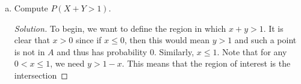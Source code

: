 \documentclass[12pt]{article}
\newenvironment{solution}
{\renewcommand\qedsymbol{$\blacksquare$}\begin{proof}[Solution]}
{\end{proof}}
\begin{document}
\begin{enumerate}
\begin{enumerate}[(a)]
\begin{solution}
                        the non-negative property of a jointly continuous pdf.
                        Next, 
                        we need a value $C>0$ such that 
                        \begin{equation*}
                            \int_{-\infty}^{\infty}\int_{-\infty}^{\infty}f_{X,
                            Y}(x, y)dxdy=1. 
                        \end{equation*}
                        Since we are integrating over the upper half of the
                        unit disk, we will convert to polar coordinates by
                        letting $x=r\cos\theta$, $y=r\sin\theta$, and changing
                        our bounds of integration to be $0\leq r\leq1$ and
                        $0\leq\theta\leq \pi$ since the integrals will evaluate
                        to zero everywhere else. With this change of
                        coordinates we have that 
                        \begin{align*}
                            \int_{0}^{\pi}\int_{0}^{1}C+Cr^2\cos\theta\sin\theta
                            \;\;dr
                            d\theta&=C\int_{0}^{\pi}\bigg(\int_{0}^{1}1
                            +r^2\cos\theta\sin\theta\;\;dr\bigg)d\theta \\
                            &=C\int_{0}^{\pi}\big(1+\frac{1}{3}\cos\theta\sin\theta\big)d\theta
                            \\
                            &=C\pi-\frac{C}{3}\int_{0}^{\pi}u\;\;du \\
                            &=C\pi-\frac{C}{6}\cos^2\theta\bigg|_{0}^{\pi} \\
                            &=C\pi.
                        \end{align*}
                        Thus if $C\pi=1$ then $C=1/\pi$. 
                    \end{solution}
                \item Compute $P(X+Y>1)$. 
                    \begin{solution}
                        To begin, we want to define the region in which
                        $x+y>1$. It is clear that $x>0$ since if $x\leq 0$,
                        then this would mean $y>1$ and such a point is not in
                        $A$ and thus has probability 0. Similarly, $x\leq 1$.
                        Note that for any $0<x\leq 1$, we need $y>1-x$. This
                        means that the region of interest is the intersection

\end{solution}
\end{enumerate}
\end{enumerate}
\end{document}
